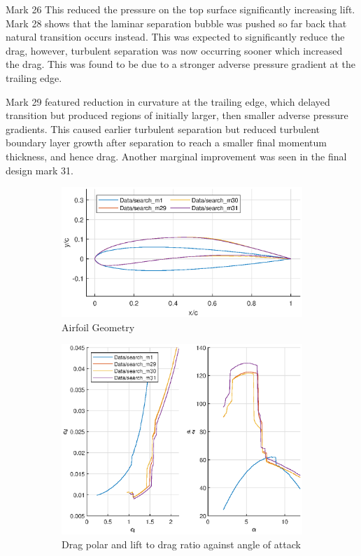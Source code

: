 \documentclass{article}
\begin{document}
Mark 26 
This reduced the pressure on the top surface significantly increasing lift.
Mark 28 shows that the laminar separation bubble was pushed so far back that natural transition occurs instead.
This was expected to significantly reduce the drag, however, turbulent separation was now occurring sooner which increased the drag.
This was found to be due to a stronger adverse pressure gradient at the trailing edge.

Mark 29 featured reduction in curvature at the trailing edge, which delayed transition but produced regions of initially larger, then smaller adverse pressure gradients.
This caused earlier turbulent separation but reduced turbulent boundary layer growth after separation to reach a smaller final momentum thickness, and hence drag.
Another marginal improvement was seen in the final design mark 31. 

\begin{figure}[H]
    \begin{subfigure}{0.54\textwidth}
        \centering
        \includegraphics[width=1.2\textwidth, center]{figures/loRe_geometry_31.eps}
        \caption{Airfoil Geometry}
        \label{fig:m31_geometry}
    \end{subfigure}
    \begin{subfigure}{0.45\textwidth}
        \centering
        \includegraphics[width=1.2\textwidth, center]{figures/loRe_lod_31.eps}
        \caption{Drag polar and lift to drag ratio against angle of attack}
        \label{fig:m31_lod}
    \end{subfigure}
    \caption{}
\end{figure}
\end{document}
